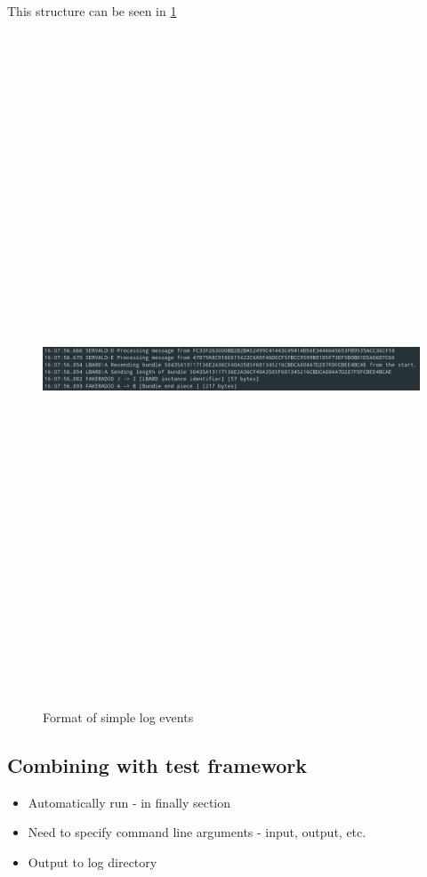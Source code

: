 This structure can be seen in \figurename{ \ref{fig:chapter5SimpleLogFormat}}
\begin{figure}
    \begin{centering}
        \includegraphics[width=15cm,height=20cm,keepaspectratio]{Figures/Chapter5-SimpleLogFormat.png}
        \caption{Format of simple log events}
        \label{fig:chapter5SimpleLogFormat}
    \end{centering}
\end{figure}


\subsection{Combining with test framework}
\begin{itemize}
    \item Automatically run - in finally section
    \item Need to specify command line arguments - input, output, etc.
    \item Output to log directory
\end{itemize}

